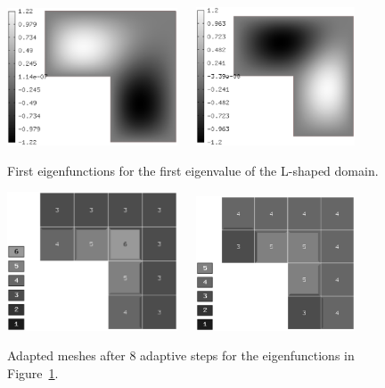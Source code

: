 \documentclass[smallextended]{svjour3}
\begin{document}
\begin{figure}[!ht]
\begin{center}
\includegraphics[width=0.45\textwidth]{lshape5.eps}\ \ \ 
\includegraphics[width=0.42\textwidth]{lshape6.eps}
\end{center}
\caption{First eigenfunctions for the first eigenvalue of the L-shaped domain.}
\label{fig:l_sh_eig3}
\end{figure}

\begin{figure}[!ht]
\begin{center}
\includegraphics[width=0.45\textwidth]{lshape7.eps}\ \ \ 
\includegraphics[width=0.42\textwidth]{lshape8.eps}
\end{center}
\caption{Adapted meshes after 8 adaptive steps for the eigenfunctions in Figure~\ref{fig:l_sh_eig3}.}
\label{fig:l_sh_eig4}
\end{figure}
\end{document}
